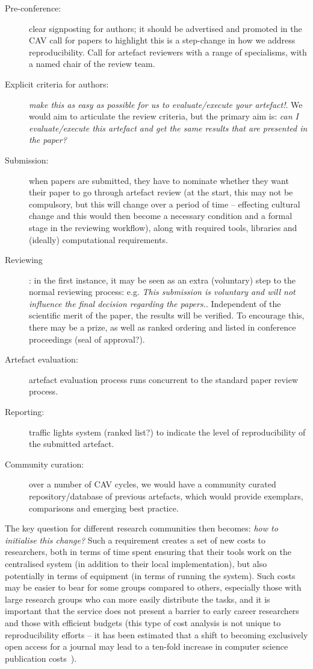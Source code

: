 \documentclass{llncs}
\begin{document}
\begin{description}
\item[Pre-conference:] clear signposting for authors; it should be
advertised and promoted in the CAV call for papers to highlight this
is a step-change in how we address reproducibility. Call for artefact
reviewers with a range of specialisms, with a named chair of the review team.
\item[Explicit criteria for authors:] {\emph{make this as
easy as possible for us to evaluate/execute your artefact!}}. We would
aim to articulate the review criteria, but the primary aim is: {\emph{can I evaluate/execute this
  artefact and get the same results that are presented in the paper?}}
\item[Submission:] when papers are submitted, they have to nominate whether they
  want their paper to go through artefact review (at the start, this
  may not be compulsory, but this will change over a period of
time -- effecting cultural change and this would then become a
necessary condition and a formal stage in the reviewing workflow),
  along with required tools, libraries and (ideally) computational requirements.
\item[Reviewing]: in the first instance, it may be seen as an extra
(voluntary) step to the normal reviewing process: e.g. {\emph{This
submission is voluntary and will not influence the final decision
regarding the papers.}}. Independent of the scientific merit of the
paper, the results will be verified. To encourage this, there may be a
prize, as well as ranked ordering and listed in conference proceedings
(seal of approval?).
\item[Artefact evaluation:] artefact evaluation process runs concurrent to the
  standard paper review process.
\item[Reporting:] traffic lights system (ranked list?) to indicate the level of
  reproducibility of the submitted artefact.
\item[Community curation:] over a number of CAV cycles, we would have a
  community curated repository/database of previous artefacts, which
  would provide exemplars, comparisons and emerging best practice.
\end{description}

The key question for different research communities then becomes:
{\emph{how to initialise this change?}} Such a requirement creates a
set of new costs to researchers, both in terms of time spent ensuring
that their tools work on the centralised system (in addition to their
local implementation), but also potentially in terms of equipment (in
terms of running the system). Such costs may be easier to bear for
some groups compared to others, especially those with large research
groups who can more easily distribute the tasks, and it is important
that the service does not present a barrier to early career
researchers and those with efficient budgets (this type of cost
analysis is not unique to reproducibility efforts -- it has been
estimated that a shift to becoming exclusively open access for a
journal may lead to a ten-fold increase in computer science
publication costs~\cite{vardi-cacm-2014}).
\end{document}
